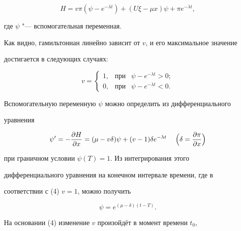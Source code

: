 \begin{equation}

\label{f3}

H=v\pi(\psi-e^{-\lambda t})+(U\xi-\mu x)\psi+\pi e^{-\lambda t},

\end{equation}



\noindent где $\psi$ "---  вспомогательная переменная. 



Как видно, гамильтониан линейно зависит от $v$, и его максимальное значение 

достигается в следующих случаях:



\begin{equation}

\label{f4}

v=\left \{ \begin{array}{ccc}

1, & \text{при}  & \psi-e^{-\lambda t} > 0; \\

 0, & \text{при} & \psi-e^{-\lambda t} < 0.   

\end{array}

\right. 

\end{equation}



Вспомогательную переменную $\psi$ можно определить из дифференциального 

уравнения 

\[

\psi^\prime = - \frac{\partial H}{\partial x}=(\mu-v\delta)\psi+(v-1)\delta e^{-\lambda t} \quad \; \Bigl(\delta=\frac{\partial \pi}{\partial x}\Bigr)

\]      



\noindent при граничном условии $\psi(T)=1$. Из интегрирования этого 

дифференциального уравнения на конечном интервале времени, где в 

соответствии с (4) $v=1$, можно получить



\[

\psi=e^{(\mu-\delta)(t-T)}. 

\]



На основании (4) изменение $v$ произойдёт в момент времени $t_0$, 

